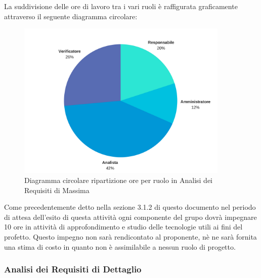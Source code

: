 			
			La suddivisione delle ore di lavoro tra i vari ruoli è raffigurata graficamente attraverso il seguente diagramma circolare:
			\begin{figure}[H] 
			\centering 
				\includegraphics[width=0.9\textwidth]{images/CircolareAnalisiRequisitiDiMassima.png} 
				\caption{Diagramma circolare ripartizione ore per ruolo in Analisi dei Requisiti di Massima}
			\label{CircolareAnalisiRequisitiDiMassima}
			\end{figure}

			
			Come precedentemente detto nella sezione 3.1.2 di questo documento nel periodo di attesa dell'esito di questa attività ogni componente del grupo dovrà impegnare 10 ore in attività di approfondimento e studio delle tecnologie utili ai fini del profetto. Questo impegno non sarà rendicontato al proponente, nè ne sarà fornita una stima di costo in quanto non è assimilabile a nessun ruolo di progetto.
		
		\subsubsection{Analisi dei Requisiti di Dettaglio}
